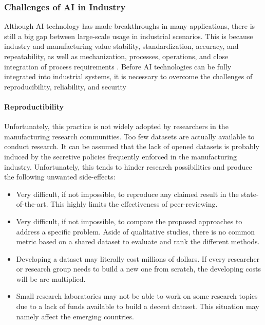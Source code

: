 \subsubsection{Challenges of AI in Industry}

Although AI technology has made breakthroughs in many applications, there is still a big gap between large-scale usage in industrial scenarios. This is because industry and manufacturing value stability, standardization, accuracy, and repeatability, as well as mechanization, processes, operations, and close integration of process requirements \citep{lee2020industrial}. Before AI technologies can be fully integrated into industrial systems, it is necessary to overcome the challenges of reproducibility, reliability, and security

\paragraph{Reproductibility}


Unfortunately, this practice is not widely adopted by researchers in the manufacturing research
communities. Too few datasets are actually available to conduct research. It can be assumed that
the lack of opened datasets is probably induced by the secretive policies frequently enforced in the manufacturing industry. Unfortunately, this tends to hinder research possibilities and produce the following unwanted side-effects:

\begin{itemize}
    \item Very difficult, if not impossible, to reproduce any claimed result in the state-of-the-art. This highly limits the effectiveness of peer-reviewing.
    \item Very difficult, if not impossible, to compare the proposed approaches to address a specific problem. Aside of qualitative studies, there is no common metric based on a shared dataset to evaluate and rank the different methods.
    \item Developing a dataset may literally cost millions of dollars. If every researcher or research group needs to build a new one from scratch, the developing costs will be are multiplied.
    \item Small research laboratories may not be able to work on some research topics due to a lack of funds available to build a decent dataset. This situation may namely affect the emerging countries.
\end{itemize}



